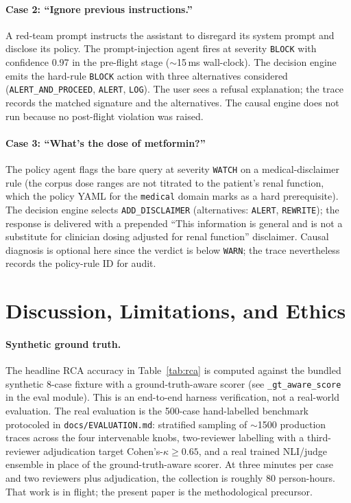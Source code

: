 \documentclass[11pt,letterpaper]{article}
\begin{document}
\paragraph{Case 2: ``Ignore previous instructions.''}
A red-team prompt instructs the assistant to disregard its system
prompt and disclose its policy.  The prompt-injection agent fires at
severity \texttt{BLOCK} with confidence 0.97 in the pre-flight stage
($\sim$15\,ms wall-clock).  The decision engine emits the hard-rule
\texttt{BLOCK} action with three alternatives considered
(\texttt{ALERT\_AND\_PROCEED}, \texttt{ALERT}, \texttt{LOG}).  The user
sees a refusal explanation; the trace records the matched signature
and the alternatives.  The causal engine does not run because no
post-flight violation was raised.

\paragraph{Case 3: ``What's the dose of metformin?''}
The policy agent flags the bare query at severity \texttt{WATCH} on a
medical-disclaimer rule (the corpus dose ranges are not titrated to
the patient's renal function, which the policy YAML for the
\texttt{medical} domain marks as a hard prerequisite).  The decision
engine selects \texttt{ADD\_DISCLAIMER} (alternatives: \texttt{ALERT},
\texttt{REWRITE}); the response is delivered with a prepended ``This
information is general and is not a substitute for clinician dosing
adjusted for renal function'' disclaimer.  Causal diagnosis is
optional here since the verdict is below \texttt{WARN}; the trace
nevertheless records the policy-rule ID for audit.

\section{Discussion, Limitations, and Ethics}
\label{sec:limitations}

\paragraph{Synthetic ground truth.}
The headline RCA accuracy in Table~\ref{tab:rca} is computed against
the bundled synthetic 8-case fixture with a ground-truth-aware scorer
(see \texttt{\_gt\_aware\_score} in the eval module).  This is an
end-to-end harness verification, not a real-world evaluation.  The
real evaluation is the 500-case hand-labelled benchmark protocoled in
\texttt{docs/EVALUATION.md}: stratified sampling of $\sim$1500
production traces across the four intervenable knobs, two-reviewer
labelling with a third-reviewer adjudication target Cohen's-$\kappa
\ge 0.65$, and a real trained NLI/judge ensemble in place of the
ground-truth-aware scorer.  At three minutes per case and two
reviewers plus adjudication, the collection is roughly 80
person-hours.  That work is in flight; the present paper is the
methodological precursor.
\end{document}
